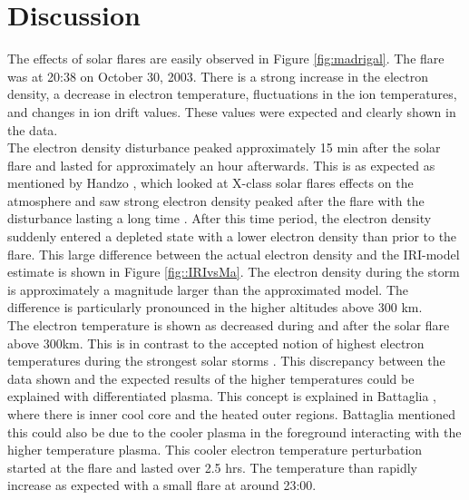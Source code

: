

\section{Discussion}

The effects of solar flares are easily observed in Figure \ref{fig:madrigal}.
The flare was at 20:38 on October 30, 2003. There is a strong increase in the electron density, a decrease in electron temperature, fluctuations in the ion temperatures, and changes in ion drift values. These values were expected and clearly shown in the data. \\

The electron density disturbance peaked approximately 15 min after the solar flare and lasted for approximately an hour afterwards. This is as expected as mentioned by Handzo \cite{Handzo}, which looked at X-class solar flares effects on the atmosphere and saw strong electron density peaked after the flare with the disturbance lasting a long time . After this time period, the electron density suddenly entered a depleted state with a lower electron density than prior to the flare. This large difference between the actual electron density and the IRI-model estimate is shown in Figure \ref{fig::IRIvsMa}. The electron density during the storm is approximately a magnitude larger than the approximated model. The difference is particularly pronounced in the higher altitudes above 300 km.\\

The electron temperature is shown as decreased during and after the solar flare above 300km. This is in contrast to the accepted notion of highest electron temperatures during the strongest solar storms \cite{Caspi}. This discrepancy between the data shown and the expected results of the higher temperatures could be explained with differentiated plasma. This concept is explained in Battaglia \cite{Battaglia}, where there is inner cool core and the heated outer regions. Battaglia mentioned this could also be due to the cooler plasma in the foreground interacting with the higher temperature plasma. This cooler electron temperature perturbation started at the flare and lasted over 2.5 hrs. The temperature than rapidly increase as expected with a small flare at around 23:00.\\

